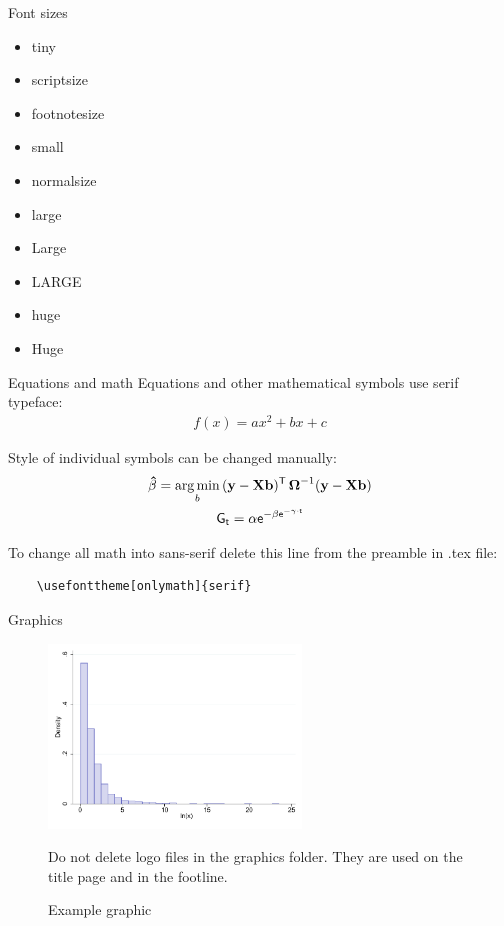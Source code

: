 \documentclass[11pt,t]{beamer}
\begin{document}
\begin{frame}{Font sizes}
\begin{itemize}
	\item \tiny tiny
	\item \scriptsize scriptsize
	\item \footnotesize footnotesize
	\item \small small
	\item \normalsize normalsize
	\item \large large
	\item \Large Large
	\item \LARGE LARGE
	\item \huge huge
	\item \Huge Huge 
\end{itemize}
\end{frame} 




\begin{frame}[fragile]{Equations and math}   %
Equations and other mathematical symbols use serif typeface:
\begin{gather*}
f(x)= a x^2 + b x + c
\end{gather*}

Style of individual symbols can be changed manually:
\begin{gather*}
\mathbf{\hat{\beta}} = \underset{b}{\rm arg\,min}\,(\mathbf{y}- \mathbf{X} \mathbf{b})^{\mathsf{T}}\,\boldsymbol{\Omega}^{-1}(\mathbf{y}- \mathbf{X} \mathbf{b}) \\
\mathsf{    G_t = \alpha e^{-\beta e^{-\gamma \cdot t}}    }
\end{gather*}

To change all math into sans-serif delete this line from the preamble in .tex file:
	\begin{verbatim}
	\usefonttheme[onlymath]{serif}
	\end{verbatim}
\end{frame}




\begin{frame}{Graphics}
\vspace{-12pt}
	\begin{figure}
	\centering
	\includegraphics[width=0.6\textwidth]{example_figure.pdf}
	\caption{Example graphic \label{fig:figure1}}
	\footnotesize
	\flushleft
	Do not delete logo files in the graphics folder. They are used on the title page and in the footline.
	\end{figure}
\end{frame}
\end{document}
